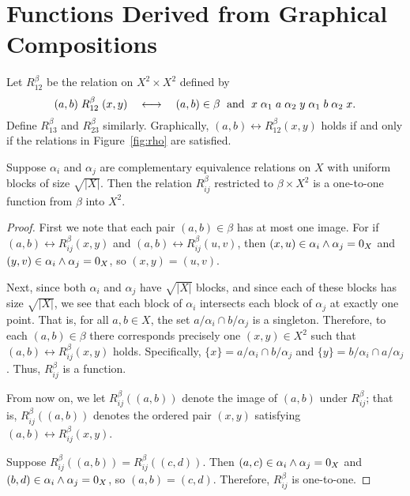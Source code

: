 \section{Functions Derived from Graphical Compositions}
Let $R_{12}^\beta$ be the relation on $X^2 \times X^2$ defined by 
\[
(a,b) \mathrel{R_{12}^\beta} (x,y) \quad \longleftrightarrow \quad 
(a,b) \in \beta \; \text{ and } \;
x \mathrel{\alpha}_1 a \mathrel{\alpha}_2 y \mathrel{\alpha}_1 b \mathrel{\alpha}_2 x.
\]
Define $R_{13}^\beta$ and $R_{23}^\beta$ similarly.  Graphically, 
$(a,b) \rel{R_{12}^\beta} (x,y)$ holds if and only if the relations in
Figure~\ref{fig:rho} are satisfied.
\begin{lemma}
\label{lem:injection}
Suppose $\alpha_i$ and $\alpha_j$ are complementary equivalence
relations on $X$ with uniform blocks of size $\sqrt{|X|}$.
Then the relation $R_{ij}^\beta$ restricted to $\beta\times X^2$ is
  a one-to-one function from $\beta$ into $X^2$.
\end{lemma}
\begin{proof}
First we note that each pair $(a,b)\in \beta$ has at most one image. For if
$(a,b) \rel{R_{ij}^\beta} (x,y)$ and $(a,b) \rel{R_{ij}^\beta} (u,v)$, then 
$(x,u) \in  \alpha_i \wedge \alpha_j = 0_X$ and 
$(y,v) \in  \alpha_i \wedge \alpha_j = 0_X$, so $(x,y) = (u,v)$.

Next,
since both $\alpha_i$ and $\alpha_j$ have 
$\sqrt{|X|}$ blocks, and since each of these blocks has size $\sqrt{|X|}$, we
see that each block of $\alpha_i$ intersects each block of $\alpha_j$ at
exactly one point.  That is, for all $a, b \in X$, the set 
$a/\alpha_i \cap b/\alpha_j$ is a singleton.
Therefore, to each $(a,b)\in \beta$ there corresponds precisely one $(x,y)\in
X^2$ such that $(a,b) \rel{R_{ij}^\beta} (x,y)$ holds.  
Specifically, $\{x\} = a/\alpha_i \cap b/\alpha_j$ and 
$\{y\} = b/\alpha_i \cap a/\alpha_j$. 
Thus,  $R_{ij}^\beta$ is a function.  

From now on, we let 
$R_{ij}^\beta((a,b))$ denote the image of $(a,b)$ under $R_{ij}^\beta$; that
is, $R_{ij}^\beta((a,b))$ denotes the ordered pair $(x,y)$
satisfying $(a,b) \rel{R_{ij}^\beta} (x,y)$.


Suppose $R_{ij}^\beta((a,b)) = R_{ij}^\beta((c,d))$. Then 
$(a,c) \in \alpha_i\wedge \alpha_j = 0_X$
and
$(b,d) \in \alpha_i\wedge \alpha_j = 0_X$, so $(a,b) = (c,d)$.
Therefore,  $R_{ij}^\beta$ is one-to-one.
\end{proof}

